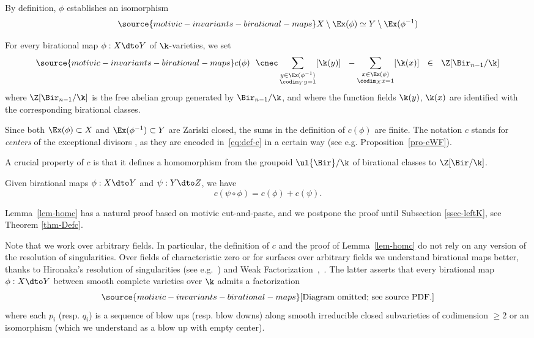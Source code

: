 By definition, $\phi$ establishes
an isomorphism
\begin{equation}\label{eq:iso-ex}
\source{motivic-invariants-birational-maps}
X \setminus \Ex(\phi) \simeq Y \setminus \Ex(\phi^{-1})
\end{equation}


\begin{Def}
For every birational map $\phi: X \dto Y$ of $\k$-varieties,
we set
\begin{equation}\label{eq:def-c}
\source{motivic-invariants-birational-maps}
c(\phi) \ \ \cnec
\sum_{\substack{y \in \Ex(\phi^{-1}) \\ \codim_Y y = 1}} [\k(y)]
 \ \ -  \sum_{\substack{x \in \Ex(\phi) \\ \codim_X x = 1}} [\k(x)] \ \ \in \ \ \Z[\Bir_{n-1}/\k]
 \end{equation}
where $\Z[\Bir_{n-1}/\k]$
is the free abelian group generated by $\Bir_{n-1}/\k$,
and where the function fields $\k(y)$, $\k(x)$ are identified
with the corresponding birational classes.
\end{Def}


Since both $\Ex(\phi) \subset X$
and $\Ex(\phi^{-1}) \subset Y$ are Zariski closed,
the sums in the definition of $c(\phi)$ are finite.
The notation $c$ stands for \emph{centers}
of the exceptional divisors \cite[Definition 2.24]{KollarMori},
as they are
encoded in~\eqref{eq:def-c}
in a certain way (see e.g. Proposition~\ref{pro-cWF}).

A crucial property
of $c$ is that it defines a homomorphism
from the groupoid $\ul{\Bir}/\k$
of birational classes to
$\Z[\Bir/\k]$.

\begin{lem}
\notready\label{lem-homc}
Given birational maps $\phi : X \dto Y$ and $\psi : Y \dto Z$,
we have
$$c(\psi \circ \phi) = c(\phi) + c(\psi).$$
\end{lem}

Lemma~\ref{lem-homc} has a natural proof
based on motivic cut-and-paste,
and we postpone the proof until Subsection
\ref{ssec-leftK},
see Theorem \ref{thm-Defc}.


Note that we work over arbitrary fields.
In particular,
the definition of $c$ and the proof of Lemma~\ref{lem-homc}
do not rely on
any version of the resolution of singularities.
Over fields of characteristic zero
or for surfaces over arbitrary fields
we understand birational maps better,
thanks to
Hironaka's resolution of singularities (see e.g.~\cite{KollarRes})
and
Weak Factorization~\cite{WF},~\cite[Lemma 54.17.2]{stacks-project}.
The latter asserts that
every birational map $\phi : X \dto Y$
between smooth complete varieties over $\k$
admits a factorization
\begin{equation}\label{eq:wf}
\source{motivic-invariants-birational-maps}
\text{[Diagram omitted; see source PDF.]}
\end{equation}
where each $p_i$ (resp. $q_i$) is a sequence of blow ups
(resp. blow downs)
along smooth irreducible closed subvarieties
of codimension $\ge 2$ or an isomorphism
(which we understand
as a blow up with empty center).

